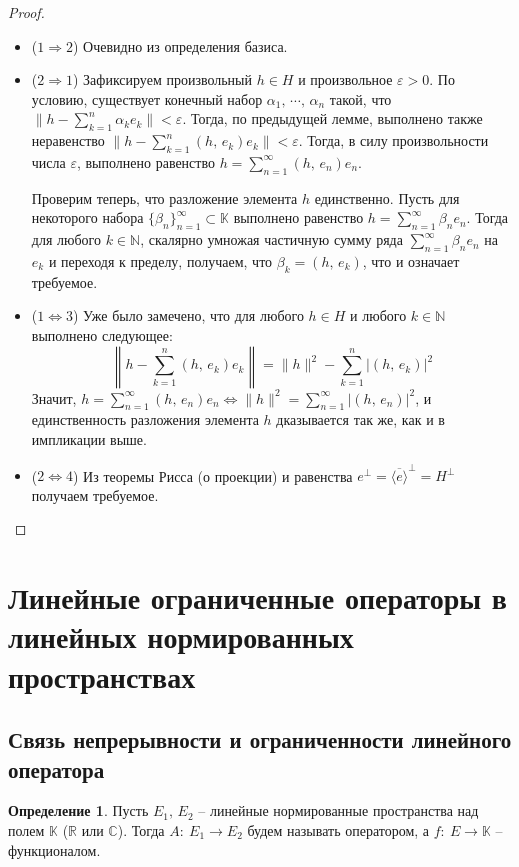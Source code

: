 \documentclass[a4paper,12pt]{article}
\theoremstyle{plain}
\theoremstyle{definition}
\newtheorem{definition}{Определение}[section]
\theoremstyle{remark}
\begin{document}
\begin{proof}
	\begin{itemize}
		\item ($1 \Rightarrow 2$) Очевидно из определения базиса.
		\item ($2 \Rightarrow 1$) Зафиксируем произвольный $h \in H$ и произвольное $\varepsilon > 0$. По условию, существует конечный набор $\alpha_1,\,\cdots,\,\alpha_n$ такой, что $\|h - \sum_{k = 1}^n \alpha_ke_k\| < \varepsilon$. Тогда, по предыдущей лемме, выполнено также неравенство $\|h - \sum_{k = 1}^n (h,\,e_k)e_k\| < \varepsilon$. Тогда, в силу произвольности числа $\varepsilon$, выполнено равенство $h = \sum_{n = 1}^\infty (h,\, e_n)e_n$.

		      Проверим теперь, что разложение элемента $h$ единственно. Пусть для некоторого набора $\{\beta_n\}_{n=1}^\infty \subset \mathbb{K}$ выполнено равенство $h = \sum_{n = 1}^\infty \beta_ne_n$. Тогда для любого $k \in \mathbb{N}$, скалярно умножая частичную сумму ряда $\sum_{n = 1}^\infty \beta_ne_n$ на $e_k$ и переходя к пределу, получаем, что $\beta_k = (h,\,e_k)$, что и означает требуемое.
		\item ($1 \Leftrightarrow 3$) Уже было замечено, что для любого $h \in H$ и любого $k \in \mathbb{N}$ выполнено следующее:
		      \[
			      \left\|h - \sum_{k = 1}^n (h,\, e_k)e_k\right\| = \|h\|^2 - \sum_{k = 1}^n \vert(h,\, e_k)\vert^2
		      \]
		      Значит, $h = \sum_{n = 1}^\infty (h,\,e_n)e_n \Leftrightarrow \|h\|^2 = \sum_{n = 1}^\infty \vert (h,\, e_n)\vert^2$, и единственность разложения элемента $h$ дказывается так же, как и в импликации выше.

		\item ($2 \Leftrightarrow 4$) Из теоремы Рисса (о проекции) и равенства $e^\bot = \overline{\langle e\rangle}^\bot = H^\bot$ получаем требуемое.
	\end{itemize}
\end{proof}

\section{Линейные ограниченные операторы в линейных нормированных пространствах}
\subsection{Связь непрерывности и ограниченности линейного оператора}
\begin{definition}
	Пусть $E_1,\,E_2$ -- линейные нормированные пространства над полем $\mathbb{K}$ ($\mathbb{R}$ или $\mathbb{C}$). Тогда $A :\: E_1 \to E_2$ будем называть оператором, а $f :\: E \to \mathbb{K}$ -- функционалом.
\end{definition}
\end{document}
